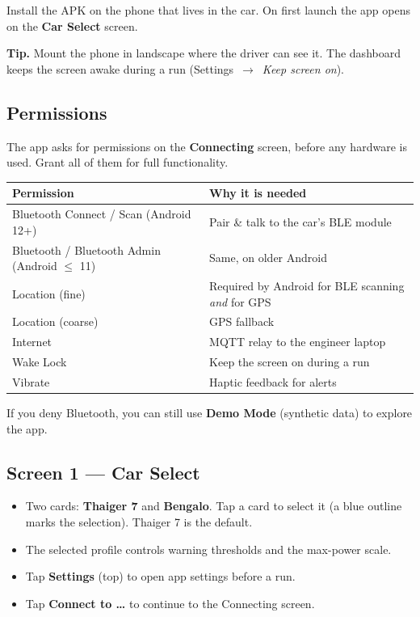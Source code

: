 \documentclass[11pt,a4paper,oneside]{report}
\newcommand{\arrow}{\,$\rightarrow$\,}
\begin{document}
\medskip
Install the APK on the phone that lives in the car. On first launch the app opens
on the \textbf{Car Select} screen.

\begin{tgnote}
\textbf{Tip.} Mount the phone in landscape where the driver can see it. The
dashboard keeps the screen awake during a run (Settings \arrow{} \emph{Keep screen
on}).
\end{tgnote}

\subsection{Permissions}
The app asks for permissions on the \textbf{Connecting} screen, before any
hardware is used. Grant all of them for full functionality.

\begin{tabularx}{\linewidth}{@{}lL@{}}
\toprule
\textbf{Permission} & \textbf{Why it is needed}\\
\midrule
Bluetooth Connect / Scan (Android 12+) & Pair \& talk to the car's BLE module\\
Bluetooth / Bluetooth Admin (Android $\le$ 11) & Same, on older Android\\
Location (fine) & Required by Android for BLE scanning \emph{and} for GPS\\
Location (coarse) & GPS fallback\\
Internet & MQTT relay to the engineer laptop\\
Wake Lock & Keep the screen on during a run\\
Vibrate & Haptic feedback for alerts\\
\bottomrule
\end{tabularx}

\medskip
If you deny Bluetooth, you can still use \textbf{Demo Mode} (synthetic data) to
explore the app.

\subsection{Screen 1 --- Car Select}
\begin{itemize}
  \item Two cards: \textbf{Thaiger 7} and \textbf{Bengalo}. Tap a card to select
    it (a blue outline marks the selection). Thaiger 7 is the default.
  \item The selected profile controls warning thresholds and the max-power scale.
  \item Tap \textbf{Settings} (top) to open app settings before a run.
  \item Tap \textbf{Connect to \ldots} to continue to the Connecting screen.
\end{itemize}
\end{document}
